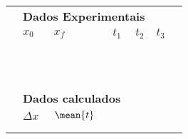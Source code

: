 \begin{table*}[!ht]
    \centering
    \begin{tabular}{lp{25mm}p{25mm}p{25mm}p{25mm}p{25mm}l}
    \toprule
        &\multicolumn{4}{l}{\textbf{Dados Experimentais}} \\
        \cmidrule{2-6}
        & $x_0$ & $x_f$ & $t_1$ & $t_2$ & $t_3$ & \\
        \cmidrule{2-6}
        & \cellcolor[gray]{0.89} & \cellcolor[gray]{0.92} & \cellcolor[gray]{0.89} & \cellcolor[gray]{0.92} & \cellcolor[gray]{0.89} \\
        & \cellcolor[gray]{0.95} & \cellcolor[gray]{0.97} & \cellcolor[gray]{0.95} & \cellcolor[gray]{0.97} & \cellcolor[gray]{0.95} \\
        & \cellcolor[gray]{0.89} & \cellcolor[gray]{0.92} & \cellcolor[gray]{0.89} & \cellcolor[gray]{0.92} & \cellcolor[gray]{0.89} \\
        & \cellcolor[gray]{0.95} & \cellcolor[gray]{0.97} & \cellcolor[gray]{0.95} & \cellcolor[gray]{0.97} & \cellcolor[gray]{0.95} \\
        & \cellcolor[gray]{0.89} & \cellcolor[gray]{0.92} & \cellcolor[gray]{0.89} & \cellcolor[gray]{0.92} & \cellcolor[gray]{0.89} \\
        & \cellcolor[gray]{0.95} & \cellcolor[gray]{0.97} & \cellcolor[gray]{0.95} & \cellcolor[gray]{0.97} & \cellcolor[gray]{0.95} \\
        & \cellcolor[gray]{0.89} & \cellcolor[gray]{0.92} & \cellcolor[gray]{0.89} & \cellcolor[gray]{0.92} & \cellcolor[gray]{0.89} \\
        & \cellcolor[gray]{0.95} & \cellcolor[gray]{0.97} & \cellcolor[gray]{0.95} & \cellcolor[gray]{0.97} & \cellcolor[gray]{0.95} \\
        & \cellcolor[gray]{0.89} & \cellcolor[gray]{0.92} & \cellcolor[gray]{0.89} & \cellcolor[gray]{0.92} & \cellcolor[gray]{0.89} \\
        & \cellcolor[gray]{0.95} & \cellcolor[gray]{0.97} & \cellcolor[gray]{0.95} & \cellcolor[gray]{0.97} & \cellcolor[gray]{0.95} \\
        \cmidrule{2-6}
    \\
        & \multicolumn{3}{l}{\textbf{Dados calculados}} \\
        \cmidrule{2-3}
        & $\Delta x$ & $\mean{t}$ \\
        \cmidrule{2-3}
        & \cellcolor[gray]{0.89} & \cellcolor[gray]{0.92} \\ 
        & \cellcolor[gray]{0.95} & \cellcolor[gray]{0.97} \\ 

\end{tabular}
\end{table*}
